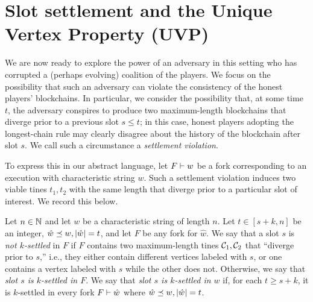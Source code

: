 \section[Slot Settlement and UVP]{Slot settlement and the Unique Vertex Property (UVP)}\label{sec:model-settlement}
  
  We are now ready to explore the power of an adversary in this
  setting who has corrupted a (perhaps evolving) coalition of the
  players. We focus on the possibility that such an adversary can
  violate the consistency of the honest players'
  blockchains. In particular, we consider the possibility that, at
  some time $t$, the adversary conspires to produce two maximum-length blockchains 
  that diverge prior to a previous slot $s \leq t$; in
  this case, honest players adopting the longest-chain rule may clearly
  disagree about the history of the blockchain after slot $s$. We call
  such a circumstance a \emph{settlement violation}.

  To express this in our abstract language, let $F \vdash w$ be a fork
  corresponding to an execution with characteristic string $w$. Such a
  settlement violation induces two viable tines $t_1, t_2$ with the
  same length that diverge prior to a particular slot of interest. We
  record this below.
    
  \begin{definition}\label{def:settlement-mh}
    Let $n \in \mathbb{N}$ and let $w$ be a characteristic string of length $n$. 
    Let $t \in [s + k, n]$ be an integer, $\hat{w} \preceq w, |\hat{w}| = t$, and 
    let $F$ be any fork for $\hat{w}$. 
    We say that a slot $s$ is \emph{not $k$-settled} in $F$ if 
    $F$ contains two maximum-length tines $\mathcal{C}_1, \mathcal{C}_2$ 
    that ``diverge prior to $s$,'' i.e., they either
    contain different vertices labeled with $s$, or one contains a
    vertex labeled with $s$ while the other does not. 
    Otherwise, we say that \emph{slot $s$ is $k$-settled in $F$}. 
    We say that \emph{slot $s$ is $k$-settled in $w$} if, 
    for each $t \geq s+k$, 
    it is $k$-settled in every fork $F \vdash \hat{w}$ where $\hat{w} \preceq w, |\hat{w}| = t$.
  \end{definition}




